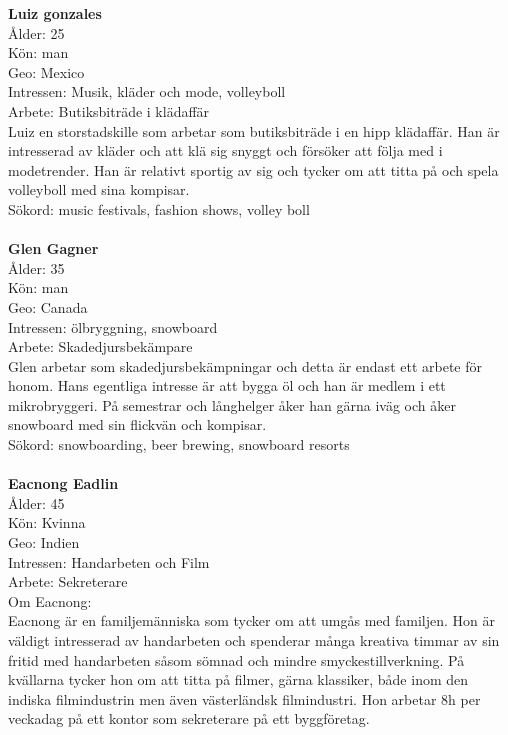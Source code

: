 \documentclass[a4paper,11pt]{article}
\begin{document}
{\begin{thebibliography}{888}
\textbf{Luiz gonzales} \\
Ålder: 25\\
Kön: man \\
Geo: Mexico\\
Intressen: Musik, kläder och mode, volleyboll \\
Arbete: Butiksbiträde i klädaffär \\

Luiz en storstadskille som arbetar som butiksbiträde i en hipp klädaffär. Han är intresserad av kläder och att klä sig snyggt och försöker att följa med i modetrender. Han är relativt sportig av sig och tycker om att titta på och spela volleyboll med sina kompisar. \\

Sökord: music festivals, fashion shows, volley boll \\\\

\textbf{Glen Gagner} \\
Ålder: 35 \\
Kön: man \\
Geo: Canada\\
Intressen: ölbryggning, snowboard \\
Arbete: Skadedjursbekämpare \\

Glen arbetar som skadedjursbekämpningar och detta är endast ett arbete för honom. Hans egentliga intresse är att bygga öl och han är medlem i ett mikrobryggeri. På semestrar och långhelger åker han gärna iväg och åker snowboard med sin flickvän och kompisar.  \\

Sökord: snowboarding, beer brewing, snowboard resorts \\\\

\textbf{Eacnong Eadlin}\\
Ålder: 45 \\
Kön: Kvinna\\
Geo: Indien\\
Intressen: Handarbeten och Film \\
Arbete: Sekreterare \\
Om Eacnong: \\

Eacnong är en familjemänniska som tycker om att umgås med familjen. Hon är väldigt intresserad av handarbeten och spenderar många kreativa timmar av sin fritid med handarbeten såsom sömnad och mindre smyckestillverkning. På kvällarna tycker hon om att titta på filmer, gärna klassiker, både inom den indiska filmindustrin men även västerländsk filmindustri. Hon arbetar 8h per veckadag på ett kontor som sekreterare på ett byggföretag. \\


\end{thebibliography}}
\end{document}
